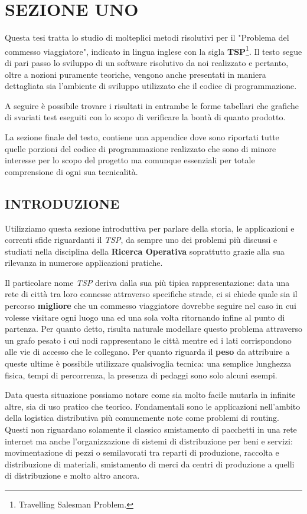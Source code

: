\documentclass[11pt]{article}
\begin{document}
\section*{SEZIONE UNO}

Questa tesi tratta lo studio di molteplici metodi risolutivi per il "Problema del commesso viaggiatore", indicato in lingua inglese con la sigla \textbf{TSP}\footnote{Travelling Salesman Problem.}. Il testo segue di pari passo lo sviluppo di un software risolutivo da noi realizzato e pertanto, oltre a nozioni puramente teoriche, vengono anche presentati in maniera dettagliata sia l'ambiente di sviluppo utilizzato che il codice di programmazione.

A seguire è possibile trovare i risultati in entrambe le forme tabellari che grafiche di svariati test eseguiti con lo scopo di verificare la bontà di quanto prodotto.

La sezione finale del testo, contiene una appendice dove sono riportati tutte quelle porzioni del codice di programmazione realizzato che sono di minore interesse per lo scopo del progetto ma comunque essenziali per totale comprensione di ogni sua tecnicalità.

\subsection*{INTRODUZIONE}

Utilizziamo questa sezione introduttiva per parlare della storia, le applicazioni e correnti sfide riguardanti il \textit{TSP}, da sempre uno dei problemi più discussi e studiati nella disciplina della \textbf{Ricerca Operativa} soprattutto grazie alla sua rilevanza in numerose applicazioni pratiche.


Il particolare nome \textit{TSP} deriva dalla sua più tipica rappresentazione: data una rete di città tra loro connesse attraverso specifiche strade, ci si chiede quale sia il percorso \textbf{migliore} che un commesso viaggiatore dovrebbe seguire nel caso in cui volesse visitare ogni luogo una ed una sola volta ritornando infine al punto di partenza. Per quanto detto, risulta naturale modellare questo problema attraverso un grafo pesato i cui nodi rappresentano le città mentre ed i lati corrispondono alle vie di accesso che le collegano. Per quanto riguarda il \textbf{peso} da attribuire a queste ultime è possibile utilizzare qualsivoglia tecnica: una semplice lunghezza fisica, tempi di percorrenza, la presenza di pedaggi sono solo alcuni esempi.

Data questa situazione possiamo notare come sia molto facile mutarla in infinite altre, sia di uso pratico che teorico. Fondamentali sono le applicazioni nell'ambito della logistica distributiva più comunemente note come problemi di routing. Questi non riguardano solamente il classico smistamento di pacchetti in una rete internet ma anche l’organizzazione di sistemi di distribuzione per beni e servizi:  movimentazione di pezzi o semilavorati tra reparti di produzione, raccolta e distribuzione di materiali, smistamento di merci da centri di produzione a quelli di distribuzione e molto altro ancora.
\end{document}
